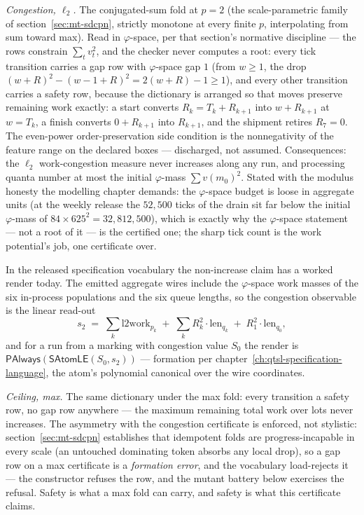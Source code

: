 \emph{Congestion, $\ell_2$.} The conjugated-sum fold at $p = 2$
(the scale-parametric family of section~\ref{sec:mt-sdcpn},
strictly monotone at every finite $p$, interpolating from sum
toward max). Read in $\varphi$-space, per that section's normative
discipline --- the rows constrain $\sum_t v_t^2$, and the checker
never computes a root: every tick transition carries a gap row with
$\varphi$-space gap $1$ (from $w \ge 1$, the drop
$(w + R)^2 - (w - 1 + R)^2 = 2(w + R) - 1 \ge 1$), and every other
transition carries a safety row, because the dictionary is arranged so
that moves preserve remaining work exactly: a start converts
$R_k = T_k + R_{k+1}$ into $w + R_{k+1}$ at $w = T_k$, a finish
converts $0 + R_{k+1}$ into $R_{k+1}$, and the shipment retires
$R_7 = 0$. The even-power order-preservation side condition is the
nonnegativity of the feature range on the declared boxes ---
discharged, not assumed. Consequences: the $\ell_2$ work-congestion
measure never increases along any run, and processing quanta number
at most the initial $\varphi$-mass $\sum v(m_0)^2$. Stated with the
modulus honesty the modelling chapter demands: the $\varphi$-space
budget is loose in aggregate units (at the weekly release the
$52{,}500$ ticks of the drain sit far below the initial
$\varphi$-mass of $84 \times 625^2 = 32{,}812{,}500$), which is
exactly why the $\varphi$-space statement --- not a root of it ---
is the certified one; the sharp tick count is the work potential's
job, one certificate over.

In the released specification vocabulary the non-increase claim has
a worked render today. The emitted aggregate wires include the
$\varphi$-space work masses of the six in-process populations and
the six queue lengths, so the congestion observable is the linear
read-out
\[
  s_2 \;=\; \sum_{k} \mathrm{l2work}_{p_k}
       \;+\; \sum_{k} R_k^2 \cdot \mathrm{len}_{q_k}
       \;+\; R_1^2 \cdot \mathrm{len}_{q_0} ,
\]
and for a run from a marking with congestion value $S_0$ the render
is $\mathsf{PAlways}(\mathsf{SAtomLE}(S_0, s_2))$ --- formation per
chapter~\ref{ch:qtsl-specification-language}, the atom's polynomial
canonical over the wire coordinates.

\emph{Ceiling, max.} The same dictionary under the max fold: every
transition a safety row, no gap row anywhere --- the maximum remaining
total work over lots never increases. The asymmetry with the
congestion certificate is enforced, not stylistic:
section~\ref{sec:mt-sdcpn} establishes that idempotent folds are
progress-incapable in every scale (an untouched dominating token
absorbs any local drop), so a gap row on a max certificate is a
\emph{formation error}, and the vocabulary load-rejects it --- the
constructor refuses the row, and the mutant battery below exercises
the refusal. Safety is what a max fold can carry, and safety is what
this certificate claims.

